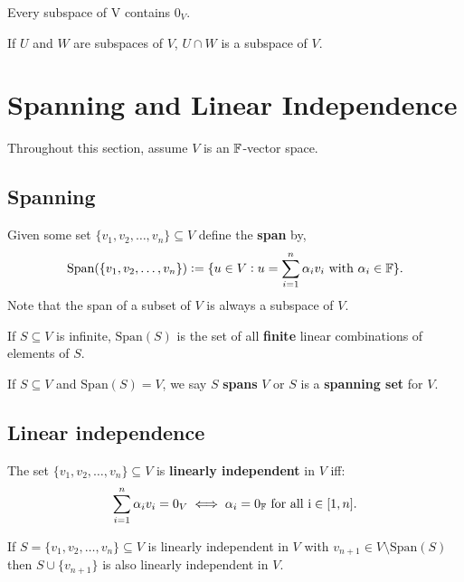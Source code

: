 \documentclass[../Year1/Year1.tex]{subfiles}
\begin{document}
\begin{theorem}
    Every subspace of V contains $0_V$.
\end{theorem}

\begin{theorem}
    If $U$ and $W$ are subspaces of $V$, $U\cap W$ is a subspace of $V$.
\end{theorem}

\section{Spanning and Linear Independence}
Throughout this section, assume $V$ is an $\mathbb{F}$-vector space.
\subsection{Spanning}
\begin{definition}[Span]
    Given some set $\{v_1,v_2,\ldots,v_n\}\subseteq V$ define the \textbf{span} by, \[
    \text{Span}(\{v_1,v_2,\ldots,v_n\}):=\{u\in V: u = \sum_{i=1}^n\alpha_i v_i \ \text{\textcolor{black}{ with }}\alpha_i\in\mathbb{F}\}\textcolor{black}{.}
    \]
    Note that the span of a subset of $V$ is always a subspace of $V$.
\end{definition}

\begin{remark}
    If $S\subseteq V$ is infinite, $\text{Span}(S)$ is the set of all \textbf{finite} linear combinations of elements of $S$.
\end{remark}

\begin{definition}
    If $S\subseteq V$ and $\text{Span}(S)=V$, we say $S$ \textbf{spans} $V$ or $S$ is a \textbf{spanning set} for $V$.
\end{definition}

\subsection{Linear independence}
\begin{definition}
    The set $\{v_1,v_2,\ldots,v_n\}\subseteq V$ is \textbf{linearly independent} in $V$ iff: \[
        \sum_{i=1}^n\alpha_i v_i = 0_V \iff \alpha_i=0_{\mathbb{F}} \ \text{\textcolor{black}{ for all }}\mathrm{i}\in[1,n]\textcolor{black}{.}
    \]
\end{definition}

\begin{theorem}
    If $S = \{v_1,v_2,\ldots,v_n\}\subseteq V$ is linearly independent in $V$ with $v_{n+1}\in V\setminus \text{Span}(S)$ then $S\cup\{v_{n+1}\}$ is also linearly independent in $V$. 
\end{theorem}
\end{document}
